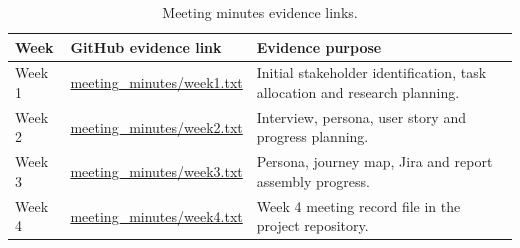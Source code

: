 \documentclass[11pt,a4paper]{article}
\begin{document}
\begin{table}[H]
    \centering
    \small
    \caption{Meeting minutes evidence links.}
    \begin{tabularx}{\textwidth}{@{}L{2.4cm} Y Y@{}}
        \toprule
        Week & GitHub evidence link & Evidence purpose\\
        \midrule
        Week 1 & \href{https://github.com/NuodiLiu/DESN2000/blob/main/meeting_minutes/week1.txt}{meeting\_minutes/week1.txt} & Initial stakeholder identification, task allocation and research planning.\\
        Week 2 & \href{https://github.com/NuodiLiu/DESN2000/blob/main/meeting_minutes/week2.txt}{meeting\_minutes/week2.txt} & Interview, persona, user story and progress planning.\\
        Week 3 & \href{https://github.com/NuodiLiu/DESN2000/blob/main/meeting_minutes/week3.txt}{meeting\_minutes/week3.txt} & Persona, journey map, Jira and report assembly progress.\\
        Week 4 & \href{https://github.com/NuodiLiu/DESN2000/blob/main/meeting_minutes/week4.txt}{meeting\_minutes/week4.txt} & Week 4 meeting record file in the project repository.\\
        \bottomrule
    \end{tabularx}
\end{table}
\end{document}
